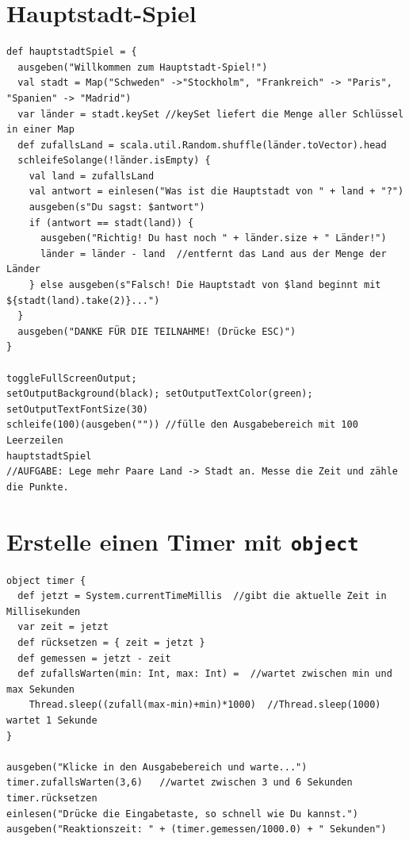\chapter{Hauptstadt-Spiel}
\begin{lstlisting}[basicstyle={\ttfamily\fontsize{13}{16}\selectfont},numbers=none]
def hauptstadtSpiel = {
  ausgeben("Willkommen zum Hauptstadt-Spiel!")
  val stadt = Map("Schweden" ->"Stockholm", "Frankreich" -> "Paris", "Spanien" -> "Madrid")
  var länder = stadt.keySet //keySet liefert die Menge aller Schlüssel in einer Map 
  def zufallsLand = scala.util.Random.shuffle(länder.toVector).head
  schleifeSolange(!länder.isEmpty) {
    val land = zufallsLand
    val antwort = einlesen("Was ist die Hauptstadt von " + land + "?")
    ausgeben(s"Du sagst: $antwort")
    if (antwort == stadt(land)) {
      ausgeben("Richtig! Du hast noch " + länder.size + " Länder!")
      länder = länder - land  //entfernt das Land aus der Menge der Länder
    } else ausgeben(s"Falsch! Die Hauptstadt von $land beginnt mit ${stadt(land).take(2)}...")
  }
  ausgeben("DANKE FÜR DIE TEILNAHME! (Drücke ESC)")
}

toggleFullScreenOutput;  
setOutputBackground(black); setOutputTextColor(green); setOutputTextFontSize(30)
schleife(100)(ausgeben("")) //fülle den Ausgabebereich mit 100 Leerzeilen
hauptstadtSpiel
//AUFGABE: Lege mehr Paare Land -> Stadt an. Messe die Zeit und zähle die Punkte.
\end{lstlisting}
        
\chapter{Erstelle einen Timer mit \lstinline{object}}
\begin{lstlisting}[basicstyle={\ttfamily\fontsize{14}{17}\selectfont},numbers=none]
object timer {
  def jetzt = System.currentTimeMillis  //gibt die aktuelle Zeit in Millisekunden
  var zeit = jetzt
  def rücksetzen = { zeit = jetzt }
  def gemessen = jetzt - zeit
  def zufallsWarten(min: Int, max: Int) =  //wartet zwischen min und max Sekunden
    Thread.sleep((zufall(max-min)+min)*1000)  //Thread.sleep(1000) wartet 1 Sekunde
}

ausgeben("Klicke in den Ausgabebereich und warte...")
timer.zufallsWarten(3,6)   //wartet zwischen 3 und 6 Sekunden
timer.rücksetzen
einlesen("Drücke die Eingabetaste, so schnell wie Du kannst.")
ausgeben("Reaktionszeit: " + (timer.gemessen/1000.0) + " Sekunden")
\end{lstlisting}
        
